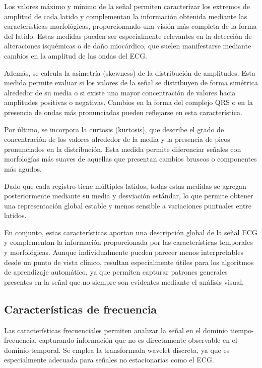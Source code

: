 \documentclass[12pt,a4paper,twoside]{book}
\begin{document}
Los valores máximo y mínimo de la señal permiten caracterizar los extremos de amplitud de cada latido y complementan la información obtenida mediante las características morfológicas, proporcionando una visión más completa de la forma del latido.
Estas medidas pueden ser especialmente relevantes en la detección de alteraciones isquémicas o de daño miocárdico, que suelen manifestarse mediante cambios en la amplitud de las ondas del ECG.

Además, se calcula la asimetría (skewness) de la distribución de amplitudes. 
Esta medida permite evaluar si los valores de la señal se distribuyen de forma simétrica alrededor de su media o si existe una mayor concentración de valores hacia amplitudes positivas o negativas. 
Cambios en la forma del complejo QRS o en la presencia de ondas más pronunciadas pueden reflejarse en esta característica.

Por último, se incorpora la curtosis (kurtosis), que describe el grado de concentración de los valores alrededor de la media y la presencia de picos pronunciados en la distribución. 
Esta medida permite diferenciar señales con morfologías más suaves de aquellas que presentan cambios bruscos o componentes más agudos.

Dado que cada registro tiene múltiples latidos, todas estas medidas se agregan posteriormente mediante su media y desviación estándar, lo que permite obtener una representación global estable y menos sensible a variaciones puntuales entre latidos.

En conjunto, estas características aportan una descripción global de la señal ECG y complementan la información proporcionada por las características temporales y morfológicas. 
Aunque individualmente pueden parecer menos interpretables desde un punto de vista clínico, resultan especialmente útiles para los algoritmos de aprendizaje automático, ya que permiten capturar patrones generales presentes en la señal que no siempre son evidentes mediante el análisis visual.

\subsection{Características de frecuencia}

Las características frecuenciales permiten analizar la señal en el dominio tiempo-frecuencia, capturando información que no es directamente observable en el dominio temporal. 
Se emplea la transformada wavelet discreta, ya que es especialmente adecuada para señales no estacionarias como el ECG.
\end{document}
